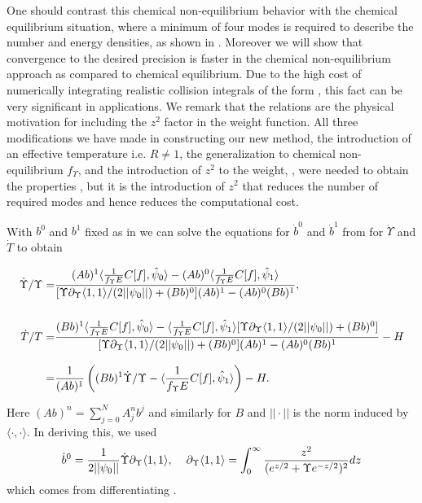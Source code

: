 One should contrast this chemical non-equilibrium behavior  with the chemical equilibrium situation, where a minimum of four modes is required to describe the number and energy densities, as shown in .   Moreover we will show that convergence to the desired precision is faster in the chemical non-equilibrium approach as compared to chemical equilibrium. Due to the high cost of numerically integrating realistic collision integrals of the form , this fact can be very significant in applications. We remark that the relations  are the physical motivation for including the $z^2$ factor in the weight function. All three modifications we have made in constructing our new method, the introduction of an effective temperature i.e. $R\ne 1$, the generalization to chemical non-equilibrium $f_\Upsilon $, and the introduction of $z^2$ to the weight, , were needed to obtain the properties , but it is the introduction of $z^2$ that reduces the number of required modes and hence reduces the computational cost. 

With $b^0$ and $b^1$ fixed as in  we can solve the equations for $\dot b^0$ and $\dot b^1$ from  for $\dot\Upsilon$ and $\dot T$ to obtain

\begin{align}\label{Ups_T_eqs}
\dot{\Upsilon}/{\Upsilon}=&\frac{(Ab)^1\langle\frac{1}{f_\Upsilon E}C[f],\hat\psi_0\rangle-(Ab)^0\langle\frac{1}{f_\Upsilon E}C[f],\hat\psi_1\rangle }{[\Upsilon\partial_\Upsilon \langle1,1\rangle/(2||\psi_0||)+(Bb)^0](Ab)^1-(Ab)^0(Bb)^1},\\[0.5cm]
\dot{T}/T
=&\frac{(Bb)^1\langle\frac{1}{f_\Upsilon E}C[f],\hat\psi_0\rangle-\langle\frac{1}{f_\Upsilon E}C[f],\hat\psi_1\rangle[\Upsilon\partial_\Upsilon \langle1,1\rangle/(2||\psi_0||)+(Bb)^0]}{[\Upsilon\partial_\Upsilon \langle1,1\rangle/(2||\psi_0||)+(Bb)^0](Ab)^1-(Ab)^0(Bb)^1}-H\notag\\[0.3cm]
=&\frac{1}{(Ab)^1}\left((Bb)^1\dot{\Upsilon}/\Upsilon-\langle\frac{1}{f_\Upsilon E}C[f],\hat\psi_1\rangle\right)-H.\label{T_eq}
\end{align}

Here $(Ab)^n=\sum_{j=0}^NA^n_jb^j$ and similarly for $B$ and $||\cdot||$ is the norm induced by $\langle\cdot,\cdot\rangle$. In deriving this, we used
\begin{equation}
\dot{b}^0=\frac{1}{2||\psi_0||}\dot\Upsilon\partial_\Upsilon \langle1,1\rangle, \hspace{4mm} \partial_\Upsilon \langle1,1\rangle=\int_0^\infty \frac{z^2}{(e^{z/2}+ \Upsilon e^{-z/2})^2}dz
\end{equation}
which comes from differentiating . 
 
